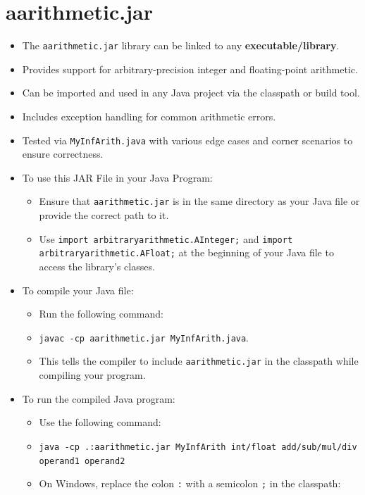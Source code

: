 \documentclass{article}
\begin{document}
\section*{aarithmetic.jar}
\begin{itemize}
    \item The \texttt{aarithmetic.jar} library can be linked to any \textbf{executable/library}.
    \item Provides support for arbitrary-precision integer and floating-point arithmetic.
    \item Can be imported and used in any Java project via the classpath or build tool.
    \item Includes exception handling for common arithmetic errors.
    \item Tested via \texttt{MyInfArith.java} with various edge cases and corner scenarios to ensure correctness.
    \item To use this JAR File in your Java Program:
        \begin{itemize}
            \item Ensure that \texttt{aarithmetic.jar} is in the same directory as your Java file or provide the correct path to it.
            \item Use \texttt{import arbitraryarithmetic.AInteger;} and \texttt{import arbitraryarithmetic.AFloat;} at the beginning of your Java file to access the library's classes.
        \end{itemize}
    \item To compile your Java file:
        \begin{itemize}
            \item Run the following command:
            \item   \texttt{javac -cp aarithmetic.jar MyInfArith.java}.
            \item This tells the compiler to include \texttt{aarithmetic.jar} in the classpath while compiling your program.
        \end{itemize}
    \item To run the compiled Java program:
        \begin{itemize}
            \item Use the following command:
            \item   \texttt{java -cp .:aarithmetic.jar MyInfArith int/float add/sub/mul/div operand1 operand2}
            \item On Windows, replace the colon \texttt{:} with a semicolon \texttt{;} in the classpath:
        \end{itemize}
\end{itemize}
\end{document}
